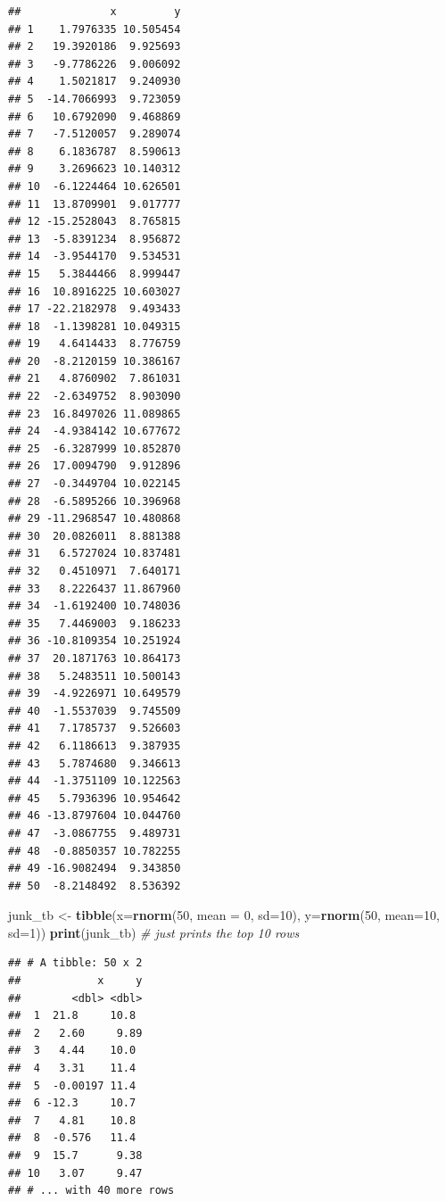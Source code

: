 \documentclass[]{article}
\newenvironment{Shaded}{\begin{snugshade}}{\end{snugshade}}
\newcommand{\CommentTok}[1]{\textcolor[rgb]{0.56,0.35,0.01}{\textit{#1}}}
\newcommand{\DataTypeTok}[1]{\textcolor[rgb]{0.13,0.29,0.53}{#1}}
\newcommand{\DecValTok}[1]{\textcolor[rgb]{0.00,0.00,0.81}{#1}}
\newcommand{\KeywordTok}[1]{\textcolor[rgb]{0.13,0.29,0.53}{\textbf{#1}}}
\newcommand{\NormalTok}[1]{#1}
\newcommand{\StringTok}[1]{\textcolor[rgb]{0.31,0.60,0.02}{#1}}
\begin{document}
\begin{verbatim}
##              x         y
## 1    1.7976335 10.505454
## 2   19.3920186  9.925693
## 3   -9.7786226  9.006092
## 4    1.5021817  9.240930
## 5  -14.7066993  9.723059
## 6   10.6792090  9.468869
## 7   -7.5120057  9.289074
## 8    6.1836787  8.590613
## 9    3.2696623 10.140312
## 10  -6.1224464 10.626501
## 11  13.8709901  9.017777
## 12 -15.2528043  8.765815
## 13  -5.8391234  8.956872
## 14  -3.9544170  9.534531
## 15   5.3844466  8.999447
## 16  10.8916225 10.603027
## 17 -22.2182978  9.493433
## 18  -1.1398281 10.049315
## 19   4.6414433  8.776759
## 20  -8.2120159 10.386167
## 21   4.8760902  7.861031
## 22  -2.6349752  8.903090
## 23  16.8497026 11.089865
## 24  -4.9384142 10.677672
## 25  -6.3287999 10.852870
## 26  17.0094790  9.912896
## 27  -0.3449704 10.022145
## 28  -6.5895266 10.396968
## 29 -11.2968547 10.480868
## 30  20.0826011  8.881388
## 31   6.5727024 10.837481
## 32   0.4510971  7.640171
## 33   8.2226437 11.867960
## 34  -1.6192400 10.748036
## 35   7.4469003  9.186233
## 36 -10.8109354 10.251924
## 37  20.1871763 10.864173
## 38   5.2483511 10.500143
## 39  -4.9226971 10.649579
## 40  -1.5537039  9.745509
## 41   7.1785737  9.526603
## 42   6.1186613  9.387935
## 43   5.7874680  9.346613
## 44  -1.3751109 10.122563
## 45   5.7936396 10.954642
## 46 -13.8797604 10.044760
## 47  -3.0867755  9.489731
## 48  -0.8850357 10.782255
## 49 -16.9082494  9.343850
## 50  -8.2148492  8.536392
\end{verbatim}

\begin{Shaded}
\begin{Highlighting}[]
\NormalTok{junk_tb <-}\StringTok{ }\KeywordTok{tibble}\NormalTok{(}\DataTypeTok{x=}\KeywordTok{rnorm}\NormalTok{(}\DecValTok{50}\NormalTok{, }\DataTypeTok{mean =} \DecValTok{0}\NormalTok{, }\DataTypeTok{sd=}\DecValTok{10}\NormalTok{), }
                      \DataTypeTok{y=}\KeywordTok{rnorm}\NormalTok{(}\DecValTok{50}\NormalTok{, }\DataTypeTok{mean=}\DecValTok{10}\NormalTok{, }\DataTypeTok{sd=}\DecValTok{1}\NormalTok{))}
\KeywordTok{print}\NormalTok{(junk_tb) }\CommentTok{# just prints the top 10 rows}
\end{Highlighting}
\end{Shaded}

\begin{verbatim}
## # A tibble: 50 x 2
##            x     y
##        <dbl> <dbl>
##  1  21.8     10.8 
##  2   2.60     9.89
##  3   4.44    10.0 
##  4   3.31    11.4 
##  5  -0.00197 11.4 
##  6 -12.3     10.7 
##  7   4.81    10.8 
##  8  -0.576   11.4 
##  9  15.7      9.38
## 10   3.07     9.47
## # ... with 40 more rows
\end{verbatim}
\end{document}
